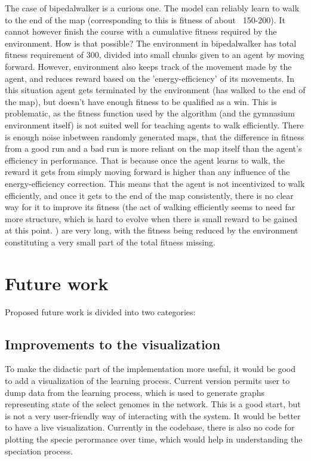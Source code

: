 \documentclass{article}
\begin{document}
    The case of bipedalwalker is a curious one. The model can reliably learn to walk to the end of the map (corresponding
    to this is fitness of about ~150-200). It cannot however finish the course with a cumulative fitness required by the
    environment. How is that possible? The environment in bipedalwalker has total fitness requirement of 300, divided
    into small chunks given to an agent by moving forward. However, environment also keeps track of the movement made
    by the agent, and reduces reward based on the 'energy-efficiency' of its movements. In this situation agent 
    gets terminated by the environment (has walked to the end of the map), but doesn't have enough fitness to be 
    qualified as a win. 
    This is problematic, as the fitness function used by the algorithm (and the gymnasium environment
    itself) is not suited well for teaching agents to walk efficiently. There is enough noise inbetween
    randomly generated maps, that the difference in fitness from a good run and a bad run is more reliant
    on the map itself than the agent's efficiency in performance.
     That is because once the agent learns to walk, the reward it gets from simply moving forward is higher than any influence
     of the energy-efficiency correction. This means that the agent is not incentivized to walk efficiently, and
     once it gets to the end of the map consistently, there is no clear way for it to improve its fitness (the 
     act of walking efficiently seems to need far more structure, which is hard to evolve when there is small 
     reward to be gained at this point.
    )
    are very long, with the fitness being reduced by the environment constituting a very small part of the total fitness missing.
\section{Future work}
    Proposed future work is divided into two categories: 
        \subsection{Improvements to the visualization} 
        To make the didactic part of the implementation more useful, it would be good to add a visualization of the
        learning process. Current version permits user to dump data from the learning process, which is used to
        generate graphs representing state of the select genomes in the network. This is a good start, but is not
        a very user-friendly way of interacting with the system. It would be better to have a live visualization.
        Currently in the codebase, there is also no code for plotting the specie perormance over time, which would
        help in understanding the speciation process.
\end{document}
